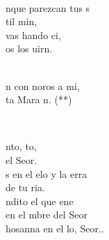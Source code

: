 \documentclass[12pt]{article}
\begin{document}
\begin{multicols*}{2}
\begin{cancion}
\begin{chorus}
	\end{chorus}%
	\jump\\
	nque parezcan tus s\\
	til min, \\
	 vas hando ci, \\
	os los uirn.\\\jump\\
	\begin{chorus}%
	n con noros a mi,\\
	ta Mara n. (**)\\
	\end{chorus}%
	\jump\\
\end{cancion}%

\begin{cancion}%
	nto, to,\\
	 el Seor.\\
	s en el elo y la erra\\
	de tu ria.\\
	ndito el que ene\\
	en el mbre del Seor\\
	hosanna en el lo, Seor..\\
\end{cancion}%


\end{multicols*}
\end{document}

